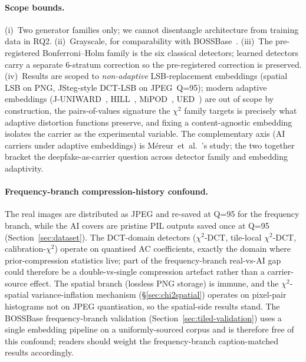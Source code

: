 \documentclass[10pt,twocolumn,a4paper]{article}
\begin{document}
\paragraph{Scope bounds.} (i)~Two generator families only; we cannot disentangle architecture from training data in RQ2. (ii)~Grayscale, for comparability with BOSSBase~\cite{bas2011boss}. (iii)~The pre-registered Bonferroni--Holm family is the six classical detectors; learned detectors carry a separate 6-stratum correction so the pre-registered correction is preserved. (iv)~Results are scoped to \emph{non-adaptive} LSB-replacement embeddings (spatial LSB on PNG, JSteg-style DCT-LSB on JPEG~Q=95); modern adaptive embeddings (J-UNIWARD~\cite{holub2014uniward}, HILL~\cite{li2014hill}, MiPOD~\cite{sedighi2016mipod}, UED~\cite{guo2014ued}) are out of scope by construction, the pairs-of-values signature the $\chi^2$ family targets is precisely what adaptive distortion functions preserve, and fixing a content-agnostic embedding isolates the carrier as the experimental variable. The complementary axis (AI carriers under adaptive embeddings) is M\'ereur~et~al.~\cite{mereur2024deepfake}'s study; the two together bracket the deepfake-as-carrier question across detector family and embedding adaptivity.

\paragraph{Frequency-branch compression-history confound.} The real images are distributed as JPEG and re-saved at Q=95 for the frequency branch, while the AI covers are pristine PIL outputs saved once at Q=95 (Section~\ref{sec:dataset}). The DCT-domain detectors ($\chi^2$-DCT, tile-local $\chi^2$-DCT, calibration-$\chi^2$) operate on quantised AC coefficients, exactly the domain where prior-compression statistics live; part of the frequency-branch real-vs-AI gap could therefore be a double-vs-single compression artefact rather than a carrier-source effect. The spatial branch (lossless PNG storage) is immune, and the $\chi^2$-spatial variance-inflation mechanism (\S\ref{sec:chi2spatial}) operates on pixel-pair histograms not on JPEG quantisation, so the spatial-side results stand. The BOSSBase frequency-branch validation (Section~\ref{sec:tiled-validation}) uses a single embedding pipeline on a uniformly-sourced corpus and is therefore free of this confound; readers should weight the frequency-branch caption-matched results accordingly.
\end{document}
